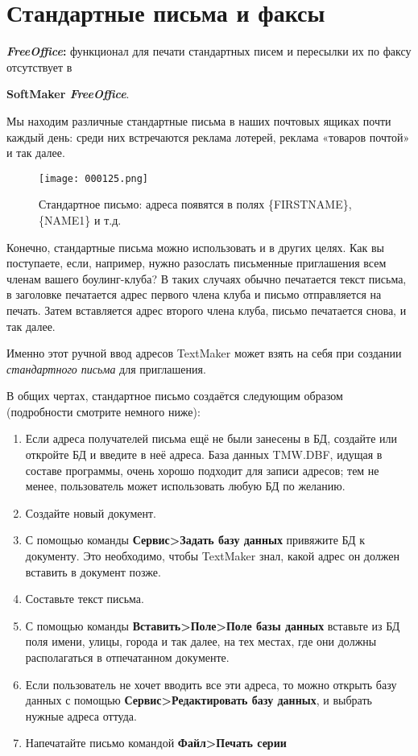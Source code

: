 ﻿\documentclass[a4paper,10pt]{article}
\begin{document}
\section{Стандартные письма и факсы} \label{sec:стандартписьмаифаксы}
\begin{mdframed}[backgroundcolor=pink!50]
\textbf{\textit{FreeOffice}:} функционал для печати стандартных писем и пересылки их по факсу отсутствует в 

\textbf{SoftMaker \textit{FreeOffice}}.
\end{mdframed}

Мы находим различные стандартные письма в наших почтовых ящиках почти каждый день: среди них встречаются реклама лотерей, реклама «товаров почтой» и так далее.

\begin{figure}[ht]
\texttt{[image: 000125.png]}
\centering
\caption{Стандартное письмо: адреса появятся в полях \{FIRSTNAME\}, \{NAME1\} и т.д.}
\end{figure}

Конечно, стандартные письма можно использовать и в других целях. Как вы поступаете, если, например, нужно разослать письменные приглашения всем членам вашего боулинг-клуба? В таких случаях обычно печатается текст письма, в заголовке печатается адрес первого члена клуба и письмо отправляется на печать. Затем вставляется адрес второго члена клуба, письмо печатается снова, и так далее.

Именно этот ручной ввод адресов TextMaker может взять на себя при создании \textit{стандартного письма} для приглашения.

В общих чертах, стандартное письмо создаётся следующим образом (подробности смотрите немного ниже):

\begin{enumerate}
 \item Если адреса получателей письма ещё не были занесены в БД, создайте или откройте БД и введите в неё адреса. База данных TMW.DBF, идущая в составе программы, очень хорошо подходит для записи адресов; тем не менее, пользователь может использовать любую БД по желанию.
 \item Создайте новый документ.
 \item С помощью команды \textbf{Сервис>Задать базу данных} привяжите БД к документу. Это необходимо, чтобы TextMaker знал, какой адрес он должен вставить в документ позже.
 \item Составьте текст письма.
 \item С помощью команды \textbf{Вставить>Поле>Поле базы данных} вставьте из БД поля имени, улицы, города и так далее, на тех местах, где они должны располагаться в отпечатанном документе. 
 \item Если пользователь не хочет вводить все эти адреса, то можно открыть базу данных с помощью \textbf{Сервис>Редактировать базу данных}, и выбрать нужные адреса оттуда.
 \item Напечатайте письмо командой \textbf{Файл>Печать серии}
\end{enumerate}
\end{document}
